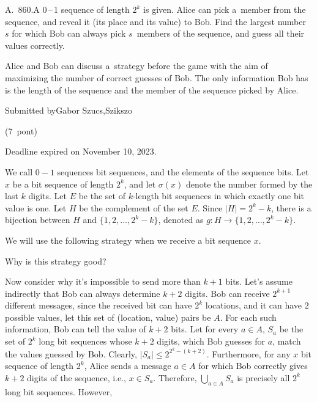 \documentclass{article}
\begin{document}
A. 860.A 0\(\displaystyle \,\)–\(\displaystyle \,\)1 sequence of length \(\displaystyle 2^k\) is given. Alice can pick a member from the sequence, and reveal it (its place and its value) to Bob. Find the largest number \(\displaystyle s\) for which Bob can always pick \(\displaystyle s\) members of the sequence, and guess all their values correctly.

Alice and Bob can discuss a strategy before the game with the aim of maximizing the number of correct guesses of Bob. The only information Bob has is the length of the sequence and the member of the sequence picked by Alice.

Submitted byGabor Szucs,Szikszo

(7 pont)

Deadline expired on November 10, 2023.

We call \(\displaystyle 0-1\) sequences bit sequences, and the elements of the sequence bits. Let \(\displaystyle x\) be a bit sequence of length \(\displaystyle 2^k\), and let \(\displaystyle \sigma(x)\) denote the number formed by the last \(\displaystyle k\) digits. Let \(\displaystyle E\) be the set of \(\displaystyle k\)-length bit sequences in which exactly one bit value is one. Let \(\displaystyle H\) be the complement of the set \(\displaystyle E\). Since \(\displaystyle |H|=2^k-k\), there is a bijection between \(\displaystyle H\) and \(\displaystyle \{1, 2, \ldots, 2^k-k\}\), denoted as \(\displaystyle g:H\rightarrow \{1, 2, \ldots, 2^k-k\}\).

We will use the following strategy when we receive a bit sequence \(\displaystyle x\).

Why is this strategy good?

Now consider why it's impossible to send more than \(\displaystyle k+1\) bits. Let's assume indirectly that Bob can always determine \(\displaystyle k+2\) digits. Bob can receive \(\displaystyle 2^{k+1}\) different messages, since the received bit can have \(\displaystyle 2^k\) locations, and it can have \(\displaystyle 2\) possible values, let this set of (location, value) pairs be \(\displaystyle A\). For each such information, Bob can tell the value of \(\displaystyle k+2\) bits. Let for every \(\displaystyle a \in A\), \(\displaystyle S_a\) be the set of \(\displaystyle 2^k\) long bit sequences whose \(\displaystyle k+2\) digits, which Bob guesses for \(\displaystyle a\), match the values guessed by Bob. Clearly, \(\displaystyle |S_a| \leq 2^{2^k-(k+2)}\). Furthermore, for any \(\displaystyle x\) bit sequence of length \(\displaystyle 2^k\), Alice sends a message \(\displaystyle a \in A\) for which Bob correctly gives \(\displaystyle k+2\) digits of the sequence, i.e., \(\displaystyle x \in S_a\). Therefore, \(\displaystyle \bigcup_{a \in A} S_a\) is precisely all \(\displaystyle 2^k\) long bit sequences. However,
\end{document}
